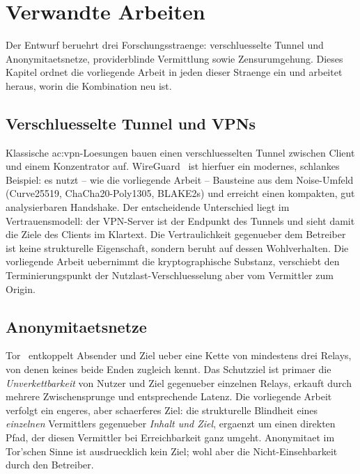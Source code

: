 \chapter{Verwandte Arbeiten}
\label{ch:relatedwork}

Der Entwurf beruehrt drei Forschungsstraenge: verschluesselte Tunnel und
Anonymitaetsnetze, providerblinde Vermittlung sowie Zensurumgehung. Dieses
Kapitel ordnet die vorliegende Arbeit in jeden dieser Straenge ein und arbeitet
heraus, worin die Kombination neu ist.

\section{Verschluesselte Tunnel und VPNs}
\label{sec:rw-vpn}

Klassische \gls{ac:vpn}-Loesungen bauen einen verschluesselten Tunnel zwischen
Client und einem Konzentrator auf. WireGuard~\cite{donenfeld2017wireguard} ist
hierfuer ein modernes, schlankes Beispiel: es nutzt -- wie die vorliegende
Arbeit -- Bausteine aus dem Noise-Umfeld (Curve25519, ChaCha20-Poly1305,
BLAKE2s) und erreicht einen kompakten, gut analysierbaren Handshake. Der
entscheidende Unterschied liegt im Vertrauensmodell: der VPN-Server ist der
Endpunkt des Tunnels und sieht damit die Ziele des Clients im Klartext. Die
Vertraulichkeit gegenueber dem Betreiber ist keine strukturelle Eigenschaft,
sondern beruht auf dessen Wohlverhalten. Die vorliegende Arbeit uebernimmt die
kryptographische Substanz, verschiebt den Terminierungspunkt der
Nutzlast-Verschluesselung aber vom Vermittler zum Origin.

\section{Anonymitaetsnetze}
\label{sec:rw-tor}

Tor~\cite{dingledine2004tor} entkoppelt Absender und Ziel ueber eine Kette von
mindestens drei Relays, von denen keines beide Enden zugleich kennt. Das
Schutzziel ist primaer die \emph{Unverkettbarkeit} von Nutzer und Ziel gegenueber
einzelnen Relays, erkauft durch mehrere Zwischensprunge und entsprechende
Latenz. Die vorliegende Arbeit verfolgt ein engeres, aber schaerferes Ziel: die
strukturelle Blindheit eines \emph{einzelnen} Vermittlers gegenueber
\emph{Inhalt und Ziel}, ergaenzt um einen direkten Pfad, der diesen Vermittler
bei Erreichbarkeit ganz umgeht. Anonymitaet im Tor'schen Sinne ist ausdruecklich
kein Ziel; wohl aber die Nicht-Einsehbarkeit durch den Betreiber.

